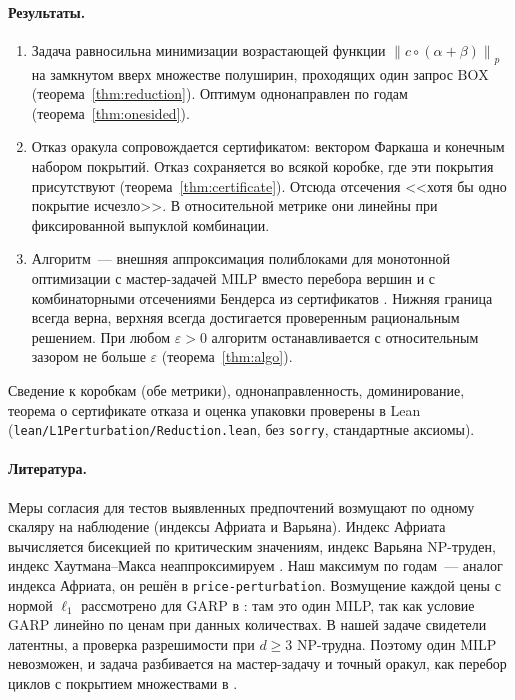\documentclass[a4paper,11pt]{article}
\theoremstyle{plain}
\theoremstyle{definition}
\theoremstyle{remark}
\newcommand{\norm}[1]{\left\lVert #1 \right\rVert}
\newcommand{\BOX}{\mathrm{BOX}}
\begin{document}
\paragraph{Результаты.}
\begin{enumerate}[label=(\roman*)]
    \item Задача равносильна минимизации возрастающей функции $\norm{c\circ(\alpha+\beta)}_p$ на замкнутом вверх множестве полуширин, проходящих один запрос $\BOX$ (теорема~\ref{thm:reduction}). Оптимум однонаправлен по годам (теорема~\ref{thm:onesided}).
    \item Отказ оракула сопровождается сертификатом: вектором Фаркаша и конечным набором покрытий. Отказ сохраняется во всякой коробке, где эти покрытия присутствуют (теорема~\ref{thm:certificate}). Отсюда отсечения <<хотя бы одно покрытие исчезло>>. В относительной метрике они линейны при фиксированной выпуклой комбинации.
    \item Алгоритм~--- внешняя аппроксимация полиблоками для монотонной оптимизации \cite{Tuy2000,TuyAlKhayyalThach2005} с мастер-задачей MILP вместо перебора вершин и с комбинаторными отсечениями Бендерса из сертификатов \cite{CodatoFischetti2006}. Нижняя граница всегда верна, верхняя всегда достигается проверенным рациональным решением. При любом $\varepsilon>0$ алгоритм останавливается с относительным зазором не больше $\varepsilon$ (теорема~\ref{thm:algo}).
\end{enumerate}
Сведение к коробкам (обе метрики), однонаправленность, доминирование, теорема о сертификате отказа и оценка упаковки проверены в Lean (\texttt{lean/L1Perturbation/Reduction.lean}, без \texttt{sorry}, стандартные аксиомы).

\paragraph{Литература.} Меры согласия для тестов выявленных предпочтений возмущают по одному скаляру на наблюдение (индексы Африата и Варьяна). Индекс Африата вычисляется бисекцией по критическим значениям, индекс Варьяна NP-труден, индекс Хаутмана--Макса неаппроксимируем \cite{Cherchye2014}. Наш максимум по годам~--- аналог индекса Африата, он решён в \texttt{price-perturbation}. Возмущение каждой цены с нормой $\ell_1$ рассмотрено для GARP в \cite{DemuynckRehbeck2023}: там это один MILP, так как условие GARP линейно по ценам при данных количествах. В нашей задаче свидетели латентны, а проверка разрешимости при $d\ge3$ NP-трудна. Поэтому один MILP невозможен, и задача разбивается на мастер-задачу и точный оракул, как перебор циклов с покрытием множествами в \cite{DeanMartin2016}.
\end{document}
